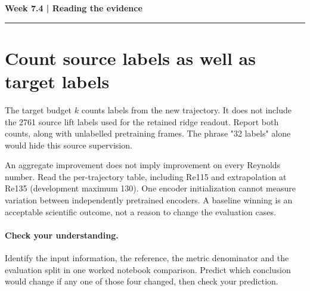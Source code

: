 \documentclass[11pt]{article}
\begin{document}
\noindent\textbf{Week 7.4 | Reading the evidence}\par\medskip\hrule\medskip
\section*{Count source labels as well as target labels}
The target budget $k$ counts labels from the new trajectory. It does not include
the 2761 source lift labels used for the retained ridge readout. Report both
counts, along with unlabelled pretraining frames. The phrase "32 labels" alone
would hide this source supervision.

An aggregate improvement does not imply improvement on every Reynolds number.
Read the per-trajectory table, including Re115 and extrapolation at Re135
(development maximum 130). One encoder initialization cannot measure variation
between independently pretrained encoders. A baseline winning is an acceptable
scientific outcome, not a reason to change the evaluation cases.
\paragraph{Check your understanding.}
Identify the input information, the reference, the metric denominator and the
evaluation split in one worked notebook comparison. Predict which conclusion
would change if any one of those four changed, then check your prediction.
\end{document}

